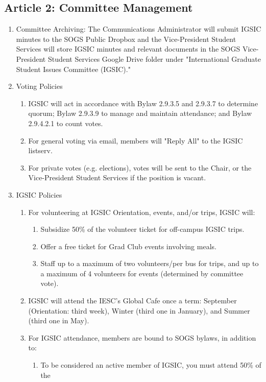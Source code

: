 \subsection{Article 2: Committee Management}
\begin{enumerate}[label*=\arabic*., align=left]
\item Committee Archiving: The Communications Administrator will submit IGSIC minutes to the
SOGS Public Dropbox and the Vice-President Student Services will store IGSIC minutes and relevant documents in the SOGS Vice-President Student Services Google Drive folder under "International Graduate Student Issues Committee (IGSIC)."
\item Voting Policies
\begin{enumerate}[label*=\arabic*., align=left]
\item IGSIC will act in accordance with Bylaw 2.9.3.5 and 2.9.3.7 to determine quorum; Bylaw 2.9.3.9 to manage and maintain attendance; and Bylaw 2.9.4.2.1 to count votes.
\item For general voting via email, members will "Reply All" to the IGSIC listserv.
\item For private votes (e.g. elections), votes will be sent to the Chair, or the Vice-President Student Services if the position is vacant.
\end{enumerate}
\item IGSIC Policies
\begin{enumerate}[label*=\arabic*., align=left]
\item For volunteering at IGSIC Orientation, events, and/or trips, IGSIC will:
\begin{enumerate}
\item Subsidize 50\% of the volunteer ticket for off-campus IGSIC trips.
\item Offer a free ticket for Grad Club events involving meals.
\item Staff up to a maximum of two volunteers/per bus for trips, and up to a maximum of 4 volunteers for events (determined by committee vote).
\end{enumerate}
\item IGSIC will attend the IESC's Global Cafe once a term: September (Orientation: third week), Winter (third one in January), and Summer (third one in May).
\item For IGSIC attendance, members are bound to SOGS bylaws, in addition to:
\begin{enumerate}
\item To be considered an active member of IGSIC, you must attend 50\% of the

\end{enumerate}
\end{enumerate}
\end{enumerate}
